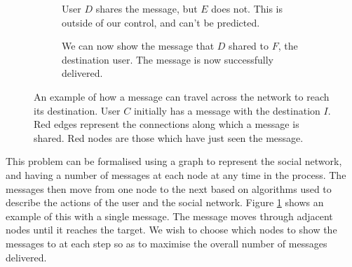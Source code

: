 \documentclass[bsc,frontabs,twoside,singlespacing,parskip,deptreport]{infthesis}     %
\begin{document}
\begin{figure}
\begin{subfigure}[]{0.48\textwidth}
\caption{User $D$ shares the message, but $E$ does not. This is outside of our control, and can't be predicted.}
\end{subfigure}
\quad
%
\begin{subfigure}[]{0.48\textwidth}
\centering
{}
\caption{We can now show the message that $D$ shared to $F$, the destination user. The message is now successfully delivered.}
\end{subfigure}
\caption{An example of how a message can travel across the network to reach its destination. User $C$ initially has a message with the destination $I$. Red edges represent the connections along which a message is shared. Red nodes are those which have just seen the message.}
\label{fig:intro_example}
\end{figure}

This problem can be formalised using a graph to represent the social network, and having a number of messages at each node at any time in the process. The messages then move from one node to the next based on algorithms used to describe the actions of the user and the social network. Figure \ref{fig:intro_example} shows an example of this with a single message. The message moves through adjacent nodes until it reaches the target. We wish to choose which nodes to show the messages to at each step so as to maximise the overall number of messages delivered.
\end{document}
